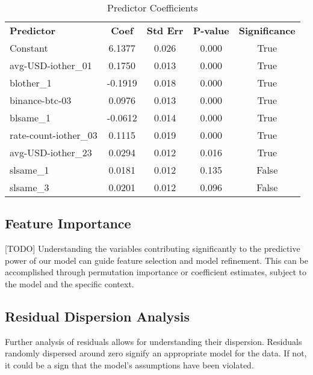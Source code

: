 \documentclass{article}
\begin{document}
\begin{table}[htbp]
  \centering
  \begin{tabular}{|l|c|c|c|c|}
  \hline
  \textbf{Predictor}        & \textbf{Coef} & \textbf{Std Err} & \textbf{P-value} & \textbf{Significance} \\
  Constant                  & 6.1377        & 0.026            & 0.000            & True                  \\
  avg-USD-iother\_01       & 0.1750        & 0.013            & 0.000            & True                  \\
  blother\_1               & -0.1919       & 0.018            & 0.000            & True                  \\
  binance-btc-03          & 0.0976        & 0.013            & 0.000            & True                  \\
  blsame\_1                & -0.0612       & 0.014            & 0.000            & True                  \\
  rate-count-iother\_03    & 0.1115        & 0.019            & 0.000            & True                  \\
  avg-USD-iother\_23       & 0.0294        & 0.012            & 0.016            & True                  \\
  slsame\_1                & 0.0181        & 0.012            & 0.135            & False                 \\
  slsame\_3                & 0.0201        & 0.012            & 0.096            & False                 \\
  \hline
  \end{tabular}
  \caption{Predictor Coefficients}
  \label{tab:predictor-coefficients}
\end{table}

\subsection{Feature Importance}
[TODO] Understanding the variables contributing significantly to the predictive power of our model can guide feature selection and model refinement. This can be accomplished through permutation importance or coefficient estimates, subject to the model and the specific context.

\subsection{Residual Dispersion Analysis}
Further analysis of residuals allows for understanding their dispersion. Residuals randomly dispersed around zero signify an appropriate model for the data. If not, it could be a sign that the model's assumptions have been violated.
\end{document}

